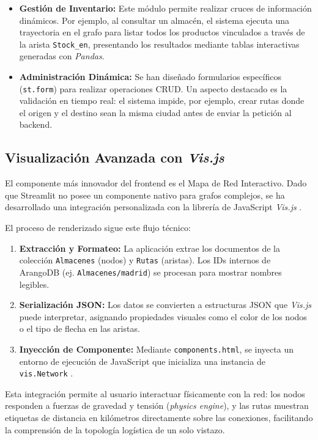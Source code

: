 \begin{itemize}
    \item \textbf{Gestión de Inventario:} Este módulo permite realizar cruces de información dinámicos. Por ejemplo, al consultar un almacén, el sistema ejecuta una trayectoria en el grafo para listar todos los productos vinculados a través de la arista \texttt{Stock\_en}, presentando los resultados mediante tablas interactivas generadas con \textit{Pandas}.
    \item \textbf{Administración Dinámica:} Se han diseñado formularios específicos (\texttt{st.form}) para realizar operaciones CRUD. Un aspecto destacado es la validación en tiempo real: el sistema impide, por ejemplo, crear rutas donde el origen y el destino sean la misma ciudad antes de enviar la petición al backend.
\end{itemize}

\subsection{Visualización Avanzada con \textit{Vis.js}}
El componente más innovador del frontend es el Mapa de Red Interactivo. Dado que Streamlit no posee un componente nativo para grafos complejos, se ha desarrollado una integración personalizada con la librería de JavaScript \textit{Vis.js} \cite{visjs_network}.

El proceso de renderizado sigue este flujo técnico:
\begin{enumerate}
    \item \textbf{Extracción y Formateo:} La aplicación extrae los documentos de la colección \texttt{Almacenes} (nodos) y \texttt{Rutas} (aristas). Los IDs internos de ArangoDB (ej. \texttt{Almacenes/madrid}) se procesan para mostrar nombres legibles.
    \item \textbf{Serialización JSON:} Los datos se convierten a estructuras JSON que \textit{Vis.js} puede interpretar, asignando propiedades visuales como el color de los nodos o el tipo de flecha en las aristas.
    \item \textbf{Inyección de Componente:} Mediante \texttt{components.html}, se inyecta un entorno de ejecución de JavaScript que inicializa una instancia de \texttt{vis.Network} \cite{streamlit_components}.
\end{enumerate}

Esta integración permite al usuario interactuar físicamente con la red: los nodos responden a fuerzas de gravedad y tensión (\textit{physics engine}), y las rutas muestran etiquetas de distancia en kilómetros directamente sobre las conexiones, facilitando la comprensión de la topología logística de un solo vistazo.

